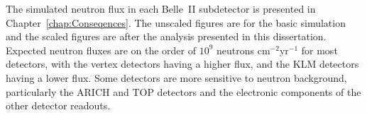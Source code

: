 The simulated neutron flux in each Belle~II subdetector is presented in Chapter~\ref{chap:Conseqences}. The unscaled figures are for the basic simulation and the scaled figures are after the analysis presented in this dissertation. Expected neutron fluxes are on the order of $10^9$ neutrons cm$^{-2}$yr$^{-1}$ for most detectors, with the vertex detectors having a higher flux, and the KLM detectors having a lower flux. Some detectors are more sensitive to neutron background, particularly the ARICH and TOP detectors and the electronic components of the other detector readouts.




















